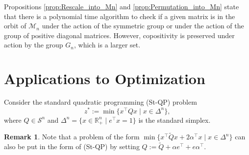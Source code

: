 \documentclass{amsart}
\newcommand{\cM}{\mathcal{M}}
\newcommand{\cS}{\mathcal{S}}
\theoremstyle{definition}
\newtheorem{remark}[theorem]{Remark}
\begin{document}
Propositions \ref{prop:Rescale_into_Mn} and \ref{prop:Permutation_into_Mn} state that there is a polynomial time algorithm to check if a given matrix is in the orbit of $\cM_n$ under the action of the symmetric group or under the action of the group of positive diagonal matrices. However, copositivity is preserved under action by the group $G_n$, which is a larger set. 

\section{Applications to Optimization}\label{sec:Optimization}

Consider the standard quadratic programming (St-QP) problem 
\begin{equation}\label{eq:non-sepStQP}
 z^*  :=  \min \{x^\top Q x \;\vert\; x \in\Delta^n\}, 
\end{equation} 
where $Q\in\cS^n$ and $\Delta^n =\{x\in\mathbb{R}^n_+ \;\vert\; e^\top x = 1\}$ is the standard simplex. 
\begin{remark}\label{rem:St-QP}
Note that a problem of the form $\min \{x^\top  \tilde Q x + 2\alpha^\top  x \;\vert\; x \in\Delta^n\}$ can also be put in the form of (St-QP) by setting $Q := \tilde Q + \alpha e^\top  + e\alpha^\top $.
%
\end{remark}
\end{document}
